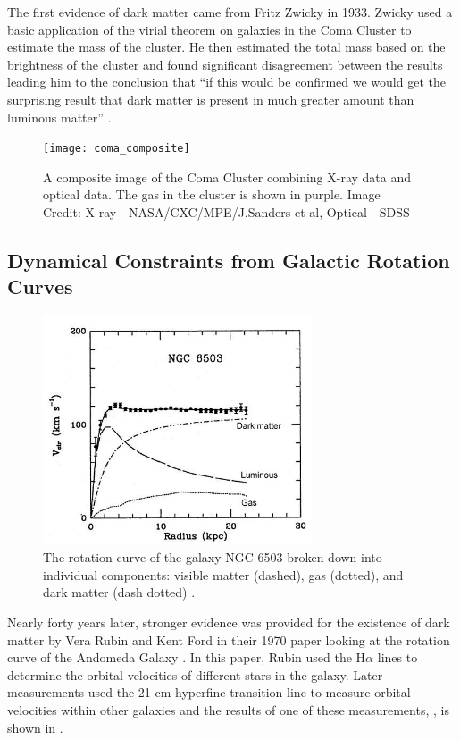 The first evidence of dark matter came from Fritz Zwicky in 1933.  Zwicky used a basic application of the virial theorem on galaxies in the Coma Cluster	to estimate the mass of the cluster.  He then  estimated the total mass based on the brightness of the cluster and found significant disagreement between the results leading him to the conclusion that ``if this would be confirmed we would get the surprising result that dark matter is present in much greater amount than luminous matter'' \cite{Zwicky1933}.
	
\begin{figure}[t]
\texttt{[image: coma\_composite]}
\centering
\caption{A composite image of the Coma Cluster combining X-ray data and optical data.  The gas in the cluster is shown in purple.  Image Credit: X-ray - NASA/CXC/MPE/J.Sanders et al, Optical - SDSS}
\end{figure}
	
	
\subsection{Dynamical Constraints from Galactic Rotation Curves}	
	


\begin{figure}[t]
	\centering
	\includegraphics[width=8cm]{ngc_6503_rotation_curve}
	\caption{The rotation curve of the galaxy NGC 6503 broken down into individual components: visible matter (dashed), gas (dotted), and dark matter (dash dotted) \cite{Begeman1991}. }
	\label{fig:galactic_rotation_curve}
\end{figure}

	
Nearly forty years later, stronger evidence was provided for the existence of dark matter by Vera Rubin and Kent Ford in their 1970 paper looking at the rotation curve of the Andomeda Galaxy \cite{rubin1970rotation}.  In this paper, Rubin used the H$\alpha$ lines to determine the orbital velocities of different stars in the galaxy.  Later measurements used the 21 cm hyperfine transition line to measure orbital velocities within other galaxies and the results of one of these measurements, , is shown in .
	
